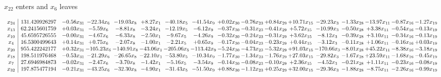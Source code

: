 \documentclass[9pt]{article}
\begin{document}
 $ x_{22} $ enters and $ x_{6} $ leaves 

 \[\begin{array}{c| c c@{\hskip 2pt} c@{\hskip 2pt} c@{\hskip 2pt} c@{\hskip 2pt} c@{\hskip 2pt} c@{\hskip 2pt} c@{\hskip 2pt} c@{\hskip 2pt} c@{\hskip 2pt} c@{\hskip 2pt} c@{\hskip 2pt} c@{\hskip 2pt} c@{\hskip 2pt} c@{\hskip 2pt} c@{\hskip 2pt} }
 x_{24}   &  131.420926297 & -0.56 x_{31} & -22.34 x_{6} & -19.03 x_{8} & +  8.27 x_{1} & -40.18 x_{5} & -41.54 x_{9} & +  0.02 x_{30} & -0.76 x_{23} & +  0.84 x_{29} & + 10.71 x_{15} & -29.23 x_{3} & -1.33 x_{28} & -13.97 x_{11} & -0.87 x_{16} & -1.27 x_{19}\\
 x_{13}   &  62.2415601759 & +  0.03 x_{31} & -5.59 x_{6} & -8.81 x_{8} & -3.24 x_{1} & -12.19 x_{5} & -6.12 x_{9} & -0.37 x_{30} & -0.31 x_{23} & -0.41 x_{29} & +  5.72 x_{15} & -10.99 x_{3} & -0.50 x_{28} & +  3.38 x_{11} & -0.54 x_{16} & -0.13 x_{19}\\
 x_{10}   &  45.6595726555 & -0.00 x_{31} & -4.67 x_{6} & -6.33 x_{8} & -2.50 x_{1} & -9.67 x_{5} & -4.26 x_{9} & -0.32 x_{30} & -0.24 x_{23} & -0.31 x_{29} & +  3.62 x_{15} & -8.12 x_{3} & -0.39 x_{28} & +  3.10 x_{11} & -0.34 x_{16} & -0.13 x_{19}\\
 x_{4}   &  16.5300499643 & +  0.14 x_{31} & +  0.75 x_{6} & -2.07 x_{8} & -1.00 x_{1} & -2.21 x_{5} & +  0.65 x_{9} & -0.17 x_{30} & -0.04 x_{23} & -0.23 x_{29} & +  0.44 x_{15} & -3.12 x_{3} & -0.11 x_{28} & +  1.06 x_{11} & -0.16 x_{16} & +  0.03 x_{19}\\
 x_{20}   &  955.422242177 & +  0.32 x_{31} & -105.23 x_{6} & -140.91 x_{8} & -43.06 x_{1} & -205.06 x_{5} & -113.42 x_{9} & -5.24 x_{30} & -4.73 x_{23} & -5.32 x_{29} & + 91.03 x_{15} & -170.66 x_{3} & -8.01 x_{28} & + 45.22 x_{11} & -8.38 x_{16} & -3.18 x_{19}\\
 x_{18}   &  198.511976468 & -0.53 x_{31} & -21.29 x_{6} & -26.65 x_{8} & -22.10 x_{1} & -53.80 x_{5} & -10.34 x_{9} & -1.77 x_{30} & -1.34 x_{23} & -1.76 x_{29} & + 27.03 x_{15} & -29.82 x_{3} & -1.67 x_{28} & + 23.59 x_{11} & -1.68 x_{16} & -0.45 x_{19}\\
 x_{7}   &  27.6946984873 & -0.02 x_{31} & -2.47 x_{6} & -3.70 x_{8} & -1.42 x_{1} & -5.16 x_{5} & -3.54 x_{9} & -0.14 x_{30} & -0.08 x_{23} & -0.10 x_{29} & +  2.36 x_{15} & -4.52 x_{3} & -0.21 x_{28} & +  1.11 x_{11} & -0.23 x_{16} & -0.08 x_{19}\\
 x_{32}   &  197.875477194 & -0.21 x_{31} & -43.25 x_{6} & -32.30 x_{8} & -4.90 x_{1} & -31.43 x_{5} & -51.50 x_{9} & +  0.88 x_{30} & -1.12 x_{23} & +  0.25 x_{29} & + 32.00 x_{15} & -29.36 x_{3} & -1.88 x_{28} & -8.75 x_{11} & -2.26 x_{16} & -0.99 x_{19}\\

\end{array}\]
\end{document}
